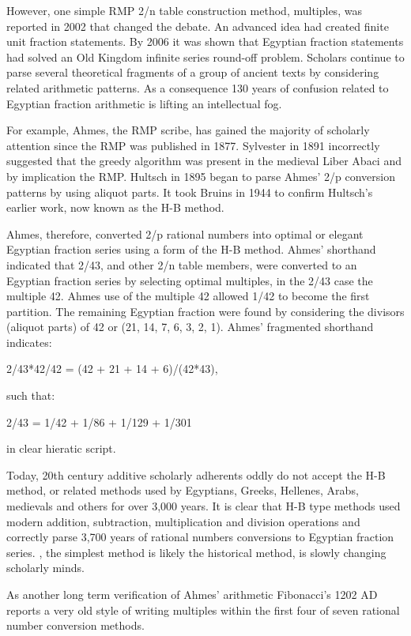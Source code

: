 \documentclass[12pt]{article}
\begin{document}
However, one simple RMP 2/n table construction method, multiples, was reported in 2002 that changed the debate. An advanced idea had created finite unit fraction statements. By 2006 it was shown that Egyptian fraction statements had solved an Old Kingdom infinite series round-off problem. Scholars continue to parse several theoretical fragments of a group of ancient texts by considering related arithmetic patterns. As a consequence 130 years of confusion related to Egyptian fraction arithmetic is lifting an intellectual fog.

For example, Ahmes, the RMP scribe, has gained the majority of scholarly attention since the RMP was published in 1877. Sylvester in 1891 incorrectly suggested that the greedy algorithm was present in the medieval Liber Abaci and by implication the RMP. Hultsch in 1895 began to parse Ahmes' 2/p conversion patterns by using aliquot parts. It took Bruins in 1944 to confirm Hultsch's earlier work, now known as the H-B method. 

Ahmes, therefore, converted 2/p rational numbers into optimal or elegant Egyptian fraction series using a form of the H-B method. Ahmes' shorthand indicated that 2/43, and other 2/n table members, were converted to an Egyptian fraction series by selecting optimal multiples, in the 2/43 case the multiple 42. Ahmes use of the multiple 42 allowed 1/42 to become the first partition. The remaining Egyptian fraction were found by considering the divisors (aliquot parts) of 42 or (21, 14, 7, 6, 3, 2, 1). Ahmes' fragmented shorthand indicates: 

2/43*42/42 = (42 + 21 + 14 + 6)/(42*43),

such that:

2/43 = 1/42 + 1/86 + 1/129 + 1/301

in clear hieratic script.

Today, 20th century additive scholarly adherents oddly do not accept the H-B method, or related methods used by Egyptians, Greeks, Hellenes, Arabs, medievals and others for over 3,000 years. It is clear that H-B type methods used modern addition, subtraction, multiplication and division operations and correctly parse 3,700 years of rational numbers conversions to Egyptian fraction series.  , the simplest method is likely the historical method, is slowly changing scholarly minds.

As another long term verification of Ahmes' arithmetic Fibonacci's 1202 AD  reports a very old style of writing multiples within the first four of seven rational number conversion methods.
\end{document}
